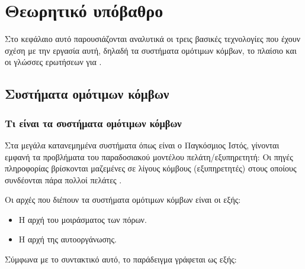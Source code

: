 \chapter{Θεωρητικό υπόβαθρο}


Στο κεφάλαιο αυτό παρουσιάζονται  αναλυτικά οι τρεις
βασικές τεχνολογίες που έχουν σχέση με την εργασία αυτή, δηλαδή τα
συστήματα ομότιμων κόμβων, το πλαίσιο  και οι γλώσσες
ερωτήσεων για .

\section{Συστήματα ομότιμων κόμβων}
\subsection{Τι είναι τα συστήματα ομότιμων κόμβων}


Στα μεγάλα κατανεμημένα συστήματα όπως είναι ο Παγκόσμιος Ιστός,
γίνονται εμφανή τα προβλήματα του παραδοσιακού μοντέλου
πελάτη/εξυπηρετητή: Οι πηγές πληροφορίας βρίσκονται μαζεμένες σε
λίγους κόμβους (εξυπηρετητές) στους οποίους συνδέονται πάρα πολλοί
πελάτες \cite{elli05}.

Οι αρχές που διέπουν τα συστήματα ομότιμων κόμβων είναι οι εξής:
\begin{itemize}
\item Η αρχή του μοιράσματος των πόρων.
\item Η αρχή της αυτοοργάνωσης.
\end{itemize}

Σύμφωνα με το συντακτικό αυτό, το παράδειγμα γράφεται ως εξής: 